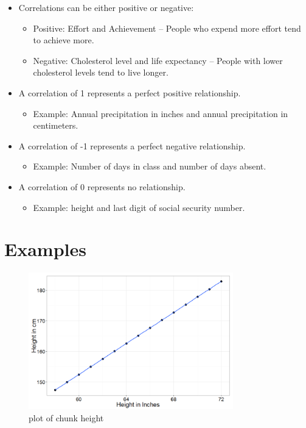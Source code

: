 \documentclass[12pt]{article}
\begin{document}
\begin{itemize}
\itemsep1pt\parskip0pt
\item
  Correlations can be either positive or negative:

  \begin{itemize}
  \itemsep1pt\parskip0pt
  \item
    Positive: Effort and Achievement -- People who expend more effort
    tend to achieve more.
  \item
    Negative: Cholesterol level and life expectancy -- People with lower
    cholesterol levels tend to live longer.
  \end{itemize}
\item
  A correlation of 1 represents a perfect positive relationship.

  \begin{itemize}
  \itemsep1pt\parskip0pt
  \item
    Example: Annual precipitation in inches and annual precipitation in
    centimeters.
  \end{itemize}
\item
  A correlation of -1 represents a perfect negative relationship.

  \begin{itemize}
  \itemsep1pt\parskip0pt
  \item
    Example: Number of days in class and number of days absent.
  \end{itemize}
\item
  A correlation of 0 represents no relationship.

  \begin{itemize}
  \itemsep1pt\parskip0pt
  \item
    Example: height and last digit of social security number.
  \end{itemize}
\end{itemize}

\section{Examples}\label{examples}

\begin{figure}[H]
\centering
\includegraphics[width=3.5in]{figure/height-1.png}
\caption{plot of chunk height}
\end{figure}
\end{document}
